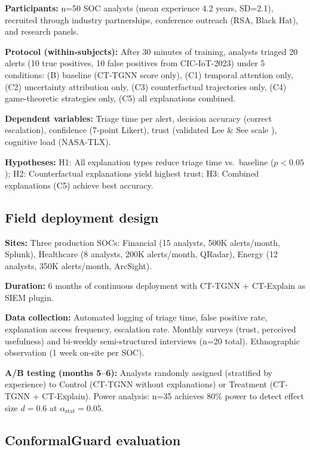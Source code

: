 \documentclass[preprint,review,12pt]{elsarticle}
\begin{document}
\textbf{Participants:} n=50 SOC analysts (mean experience 4.2 years, SD=2.1), recruited through industry partnerships, conference outreach (RSA, Black Hat), and research panels.

\textbf{Protocol (within-subjects):} After 30 minutes of training, analysts triaged 20 alerts (10 true positives, 10 false positives from CIC-IoT-2023) under 5 conditions: (B) baseline (CT-TGNN score only), (C1) temporal attention only, (C2) uncertainty attribution only, (C3) counterfactual trajectories only, (C4) game-theoretic strategies only, (C5) all explanations combined.

\textbf{Dependent variables:} Triage time per alert, decision accuracy (correct escalation), confidence (7-point Likert), trust (validated Lee \& See scale \cite{lee_see_2004}), cognitive load (NASA-TLX).

\textbf{Hypotheses:} H1: All explanation types reduce triage time vs.\ baseline ($p < 0.05$); H2: Counterfactual explanations yield highest trust; H3: Combined explanations (C5) achieve best accuracy.

\subsection{Field deployment design}

\textbf{Sites:} Three production SOCs: Financial (15 analysts, 500K alerts/month, Splunk), Healthcare (8 analysts, 200K alerts/month, QRadar), Energy (12 analysts, 350K alerts/month, ArcSight).

\textbf{Duration:} 6 months of continuous deployment with CT-TGNN + CT-Explain as SIEM plugin.

\textbf{Data collection:} Automated logging of triage time, false positive rate, explanation access frequency, escalation rate. Monthly surveys (trust, perceived usefulness) and bi-weekly semi-structured interviews (n=20 total). Ethnographic observation (1 week on-site per SOC).

\textbf{A/B testing (months 5--6):} Analysts randomly assigned (stratified by experience) to Control (CT-TGNN without explanations) or Treatment (CT-TGNN + CT-Explain). Power analysis: n=35 achieves 80\% power to detect effect size $d=0.6$ at $\alpha_{\text{stat}}=0.05$.

\subsection{ConformalGuard evaluation}
\end{document}
